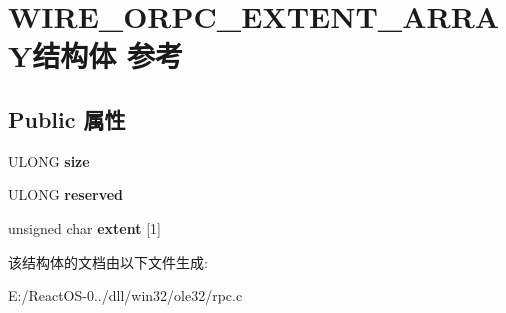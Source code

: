 \hypertarget{struct_w_i_r_e___o_r_p_c___e_x_t_e_n_t___a_r_r_a_y}{}\section{W\+I\+R\+E\+\_\+\+O\+R\+P\+C\+\_\+\+E\+X\+T\+E\+N\+T\+\_\+\+A\+R\+R\+A\+Y结构体 参考}
\label{struct_w_i_r_e___o_r_p_c___e_x_t_e_n_t___a_r_r_a_y}
\subsection*{Public 属性}
\begin{DoxyCompactItemize}
\item 
\mbox{\label{struct_w_i_r_e___o_r_p_c___e_x_t_e_n_t___a_r_r_a_y_a479a344bfc23eecc7e9ef589d4ac8353}} 
U\+L\+O\+NG {\bfseries size}
\item 
\mbox{\label{struct_w_i_r_e___o_r_p_c___e_x_t_e_n_t___a_r_r_a_y_a22ba4ac43d942125cdd98e2bdcec9545}} 
U\+L\+O\+NG {\bfseries reserved}
\item 
\mbox{\label{struct_w_i_r_e___o_r_p_c___e_x_t_e_n_t___a_r_r_a_y_ab310cde89d64a2856a6d1181e47d4b9a}} 
unsigned char {\bfseries extent} \mbox{[}1\mbox{]}
\end{DoxyCompactItemize}


该结构体的文档由以下文件生成\+:\begin{DoxyCompactItemize}
\item 
E\+:/\+React\+O\+S-\/0../dll/win32/ole32/rpc.\+c\end{DoxyCompactItemize}
